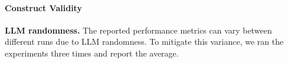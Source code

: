 \paragraph{Construct Validity}

\textbf{LLM randomness.} The reported performance metrics can vary between different runs due to LLM randomness. To mitigate this variance, we ran the experiments three times and report the average.
